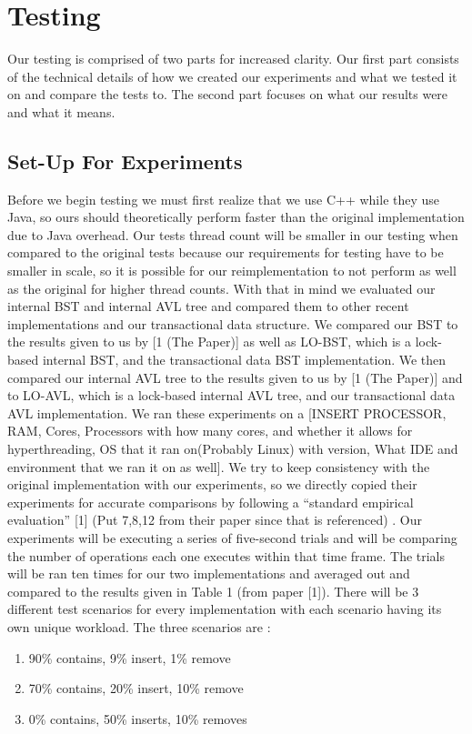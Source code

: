\documentclass[conference]{IEEEtran}
\begin{document}
\section{Testing}

Our testing is comprised of two parts for increased clarity. Our first part consists of the technical details of how we created our experiments and what we tested it on and compare the tests to. The second part focuses on what our results were and what it means.

\subsection{Set-Up For Experiments}
Before we begin testing we must first realize that we use C++ while they use Java, so ours should theoretically perform faster than the original implementation due to Java overhead. Our tests thread count will be smaller in our testing when compared to the original tests because our requirements for testing have to be smaller in scale, so it is possible for our reimplementation to not perform as well as the original for higher thread counts. With that in mind we evaluated our internal BST and internal AVL tree and compared them to other recent implementations and our transactional data structure. We compared our BST to the results given to us by [1 (The Paper)] as well as LO-BST, which is a lock-based internal BST, and the transactional data BST implementation. We then compared our internal AVL tree to the results given to us by [1 (The Paper)] and to LO-AVL, which is a lock-based internal AVL tree, and our transactional data AVL implementation. 
We ran these experiments on a [INSERT PROCESSOR, RAM, Cores, Processors with how many cores, and whether it allows for hyperthreading, OS that it ran on(Probably Linux) with version, What IDE and environment that we ran it on as well].
We try to keep consistency with the original implementation with our experiments, so we directly copied their experiments for accurate comparisons by following a “standard empirical evaluation” [1] (Put 7,8,12 from their paper since that is referenced) . Our experiments will be executing a series of five-second trials and will be comparing the number of operations each one executes within that time frame. The trials will be ran ten times for our two implementations and averaged out and compared to the results given in Table 1 (from paper [1]). There will be 3 different test scenarios for every implementation with each scenario having its own unique workload. The three scenarios are : 
\begin{enumerate}[label=(\roman*)]
	\item 90\% contains, 9\% insert, 1\% remove
	\item 70\% contains, 20\% insert, 10\% remove
	\item 0\% contains, 50\% inserts, 10\% removes
\end{enumerate}
\end{document}
